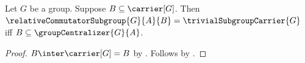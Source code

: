 \begin{corollary}\label{relative_commutator_trivial_iff_right_subset_centralizer}
    Let $G$ be a group.
    Suppose $B\subseteq\carrier[G]$.
    Then
        $\relativeCommutatorSubgroup{G}{A}{B}=
            \trivialSubgroupCarrier{G}$ iff
        $B\subseteq\groupCentralizer{G}{A}$.
\end{corollary}
\begin{proof}
    $B\inter\carrier[G]=B$ by
        .
    Follows by
        .
\end{proof}
